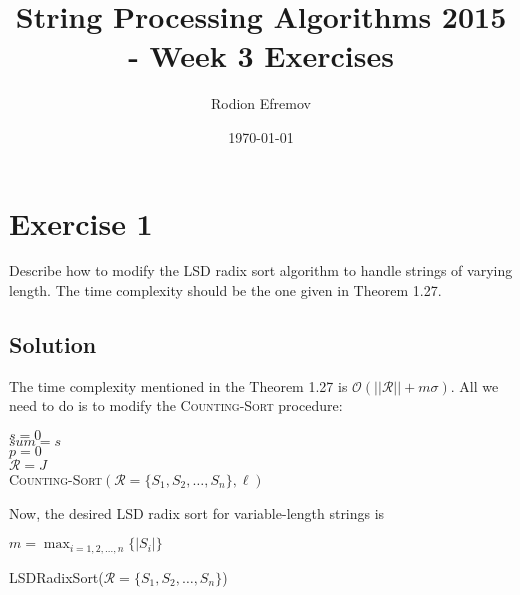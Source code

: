 \documentclass[10pt]{article}
\title{String Processing Algorithms 2015 - Week 3 Exercises}
\author{Rodion Efremov}
\date{\today}
\begin{document}
\maketitle

\section*{Exercise 1}
\color{blue}
Describe how to modify the LSD radix sort algorithm to handle strings of varying length. The time complexity should be the one given in Theorem 1.27.
\color{black}

\subsection*{Solution}
The time complexity mentioned in the Theorem 1.27 is $\mathcal{O}(||\mathcal{R}|| + m\sigma)$. All we need to do is to modify the \textsc{Counting-Sort} procedure:
\begin{algorithm}
$s = 0$ \\
$sum = s$ \\
$p = 0$ \\
$\mathcal{R} = J$ \\
\caption{\textsc{Counting-Sort}$(\mathcal{R} = \{ S_1, S_2, \dots, S_n \}, \ell)$}
\end{algorithm}

Now, the desired LSD radix sort for variable-length strings is
\begin{algorithm}
$m = \max_{i = 1, 2, \dots, n} \{ |S_i| \}$ \\
\caption{LSDRadixSort($\mathcal{R} = \{ S_1, S_2, \dots, S_n \}$)}
\end{algorithm}
\end{document}
